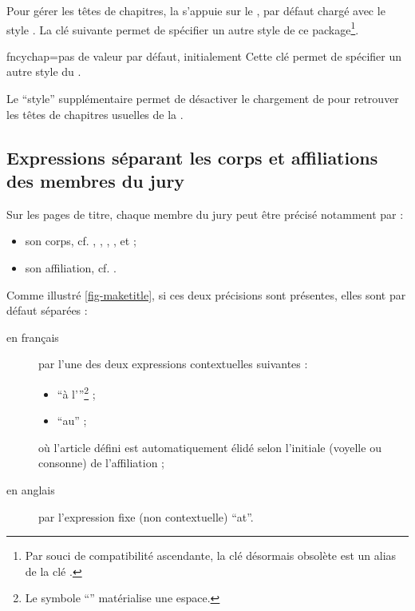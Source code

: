Pour gérer les têtes de chapitres, la \yatcl{} s'appuie sur le
, par défaut chargé avec le style . La
clé  suivante permet de spécifier un autre style de ce
package\footnote{Par souci de compatibilité ascendante, la clé désormais
  obsolète  est un alias de la clé
  .}.%
%
{%
  \begin{docKey}{fncychap}{=\textbar{}\textbar{}\textbar{}\textbar{}\textbar{}\textbar{}\textbar{}\textbar{}}{pas
      de valeur par défaut, initialement }
    Cette clé permet de spécifier un autre style du .

    Le \enquote{style} supplémentaire  permet de désactiver le
    chargement de  pour retrouver les têtes de chapitres
    usuelles de la .
  \end{docKey}
}

\subsection{Expressions séparant les corps et affiliations des membres du jury}
\label{sec-expr-separ-les}

Sur les pages de titre, chaque membre du jury peut être précisé notamment par :
\begin{itemize}
\item son corps, cf. , , ,
  ,  et
   ;
\item son affiliation, cf. .
\end{itemize}
Comme illustré \vref{fig-maketitle}, si ces deux précisions sont présentes,
elles sont par défaut séparées :
\begin{description}
\item[en français] par l'une des deux expressions contextuelles suivantes :
  \begin{itemize}
  \item \enquote{\textvisiblespace{}à l'}\footnote{Le symbole
      \enquote{\textvisiblespace{}} matérialise une espace.} ;
  \item \enquote{\textvisiblespace{}au\textvisiblespace{}} ;
  \end{itemize}
  où l'article défini est automatiquement élidé selon l'initiale (voyelle ou
  consonne) de l'affiliation ;
\item[en anglais] par l'expression fixe (non contextuelle)
  \enquote{\textvisiblespace{}at\textvisiblespace{}}.
\end{description}

